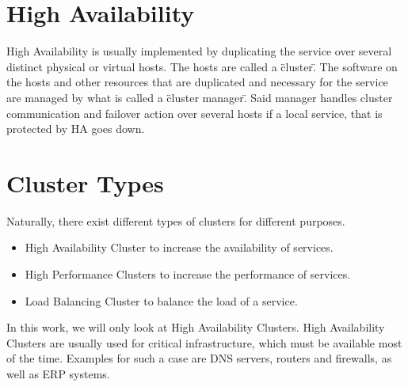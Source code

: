 


\section{High Availability}


High Availability is usually implemented by duplicating the service over several distinct physical or
virtual hosts. The hosts are called a \"cluster\". The software on the hosts and other resources
that are duplicated and necessary for the service are managed by what is called a \"cluster manager\".
Said manager handles cluster communication and failover action over several hosts if a local service,
that is protected by \ac{HA} goes down.

\section{Cluster Types}

Naturally, there exist different types of clusters for different purposes.
\begin{itemize}
\item High Availability Cluster to increase the availability of services.
\item High Performance Clusters to increase the performance of services.
\item Load Balancing Cluster to balance the load of a service.
\end{itemize}

In this work, we will only look at High Availability Clusters.
High Availability Clusters are usually used for critical infrastructure,
which must be available most of the time. Examples for such a case are DNS servers,
routers and firewalls, as well as \ac{ERP} systems.
